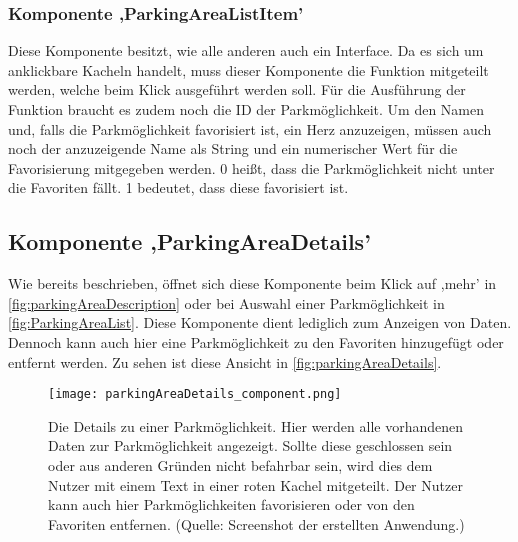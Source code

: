 \subsubsection{Komponente ,ParkingAreaListItem'}
\label{parkingAreaListItem}
Diese Komponente besitzt, wie alle anderen auch ein Interface. Da es sich um anklickbare Kacheln handelt, muss dieser Komponente die Funktion mitgeteilt werden, welche beim Klick ausgeführt werden soll. Für die Ausführung der Funktion braucht es zudem noch die ID der Parkmöglichkeit. Um den Namen und, falls die Parkmöglichkeit favorisiert ist, ein Herz anzuzeigen, müssen auch noch der anzuzeigende Name als String und ein numerischer Wert für die Favorisierung mitgegeben werden. 0 heißt, dass die Parkmöglichkeit nicht unter die Favoriten fällt. 1 bedeutet, dass diese favorisiert ist.

\subsection{Komponente ,ParkingAreaDetails'}
\label{parkingAreaDetails}
Wie bereits beschrieben, öffnet sich diese Komponente beim Klick auf ,mehr' in \autoref{fig:parkingAreaDescription} oder bei Auswahl einer Parkmöglichkeit in \autoref{fig:ParkingAreaList}. Diese Komponente dient lediglich zum Anzeigen von Daten. Dennoch kann auch hier eine Parkmöglichkeit zu den Favoriten hinzugefügt oder entfernt werden. Zu sehen ist diese Ansicht in \autoref{fig:parkingAreaDetails}.

\begin{figure}[h!]
	\centering
	\texttt{[image: parkingAreaDetails\_component.png]}
	\caption[Die Details zu einer Parkmöglichkeit. Hier werden alle vorhandenen Daten zur Parkmöglichkeit angezeigt. Sollte diese geschlossen sein oder aus anderen Gründen nicht befahrbar sein, wird dies dem Nutzer mit einem Text in einer roten Kachel mitgeteilt. Der Nutzer kann auch hier Parkmöglichkeiten favorisieren oder von den Favoriten entfernen.]
	{Die Details zu einer Parkmöglichkeit. Hier werden alle vorhandenen Daten zur Parkmöglichkeit angezeigt. Sollte diese geschlossen sein oder aus anderen Gründen nicht befahrbar sein, wird dies dem Nutzer mit einem Text in einer roten Kachel mitgeteilt. Der Nutzer kann auch hier Parkmöglichkeiten favorisieren oder von den Favoriten entfernen. (Quelle: Screenshot der erstellten Anwendung.)}
	\label{fig:parkingAreaDetails}
\end{figure}

